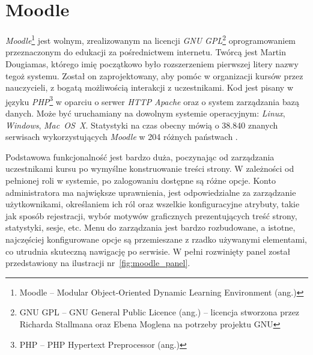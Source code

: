 \documentclass[12pt,twoside]{report}
\begin{document}
\section{Moodle}
\emph{Moodle}\footnote{Moodle -- Modular Object-Oriented Dynamic Learning Environment (ang.)}
jest wolnym, zrealizowanym na licencji \emph{GNU GPL}\footnote{GNU GPL -- GNU General Public
Licence (ang.) -- licencja stworzona przez Richarda Stallmana oraz Ebena Moglena na potrzeby
projektu GNU} oprogramowaniem przeznaczonym do edukacji za pośrednictwem internetu. Twórcą
jest Martin Dougiamas, którego imię początkowo było rozszerzeniem pierwszej litery nazwy
tegoż systemu. Został on zaprojektowany, aby pomóc w organizacji kursów przez nauczycieli,
z bogatą możliwością interakcji z uczestnikami. Kod jest pisany w języku
\emph{PHP}\footnote{PHP -- PHP Hypertext Preprocessor (ang.)} w oparciu o serwer \emph{HTTP}
\emph{Apache} oraz o system zarządzania bazą danych. Może być uruchamiany na dowolnym
systemie operacyjnym: \emph{Linux}, \emph{Windows}, \emph{Mac~OS~X}. Statystyki na czas
obecny mówią o 38.840 znanych serwisach wykorzystujących \emph{Moodle} w 204 różnych
państwach \cite{moodle-statistics}.


Podstawowa funkcjonalność jest bardzo duża, poczynając od zarządzania uczestnikami kursu
po wymyślne konstruowanie treści strony. W zależności od pełnionej roli w systemie, po
zalogowaniu dostępne są różne opcje. Konto administratora ma największe
uprawnienia, jest odpowiedzialne za zarządzanie użytkownikami, określaniem ich ról oraz
wszelkie konfiguracyjne atrybuty, takie jak sposób rejestracji, wybór motywów graficznych
prezentujących treść strony, statystyki, sesje, etc.
Menu do zarządzania jest bardzo rozbudowane, a istotne, najczęściej konfigurowane opcje są
przemieszane z rzadko używanymi elementami, co utrudnia skuteczną nawigację po serwisie.
W pełni rozwinięty panel został przedstawiony na ilustracji nr~\ref{fig:moodle_panel}.
\end{document}
